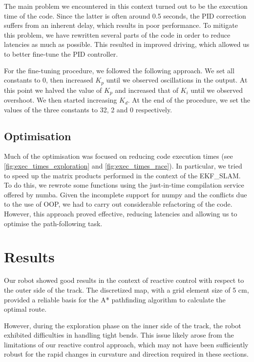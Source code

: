 \documentclass[
	12pt,
]{sty/report_style}
\begin{document}
The main problem we encountered in this context turned out to be the execution time of the code. Since the latter is often around 0.5 seconds, the PID correction suffers from an inherent delay, which results in poor performance. To mitigate this problem, we have rewritten several parts of the code in order to reduce latencies as much as possible. This resulted in improved driving, which allowed us to better fine-tune the PID controller.

For the fine-tuning procedure, we followed the following approach. We set all constants to 0, then increased $K_p$ until we observed oscillations in the output. At this point we halved the value of $K_p$ and increased that of $K_i$ until we observed overshoot. We then started increasing $K_d$. At the end of the procedure, we set the values of the three constants to 32, 2 and 0 respectively.

\subsection{Optimisation}\label{sec:optimisation}

Much of the optimisation was focused on reducing code execution times (see \cref{fig:exec_times_exploration} and \cref{fig:exec_times_race}). In particular, we tried to speed up the matrix products performed in the context of the EKF\_SLAM. To do this, we rewrote some functions using the just-in-time compilation service offered by numba. Given the incomplete support for numpy and the conflicts due to the use of OOP, we had to carry out considerable refactoring of the code. However, this approach proved effective, reducing latencies and allowing us to optimise the path-following task.

\section{Results}


Our robot showed good results in the context of reactive control with respect to the outer side of the track. The discretized map, with a grid element size of 5 cm, provided a reliable basis for the A* pathfinding algorithm to calculate the optimal route.

However, during the exploration phase on the inner side of the track, the robot exhibited difficulties in handling tight bends. This issue likely arose from the limitations of our reactive control approach, which may not have been sufficiently robust for the rapid changes in curvature and direction required in these sections.
\end{document}
